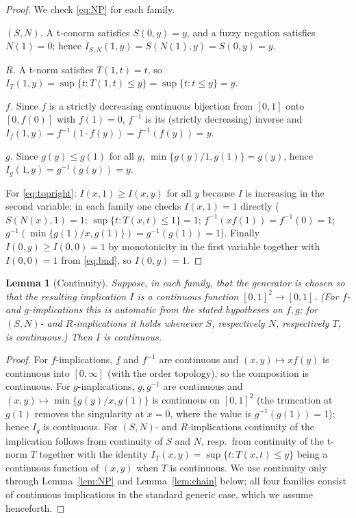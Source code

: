 \documentclass{amsart}
\theoremstyle{plain}
\newtheorem{lemma}{Lemma}
\theoremstyle{definition}
\begin{document}
\begin{proof}
We check \eqref{eq:NP} for each family.

\emph{$(S,N)$.} A t-conorm satisfies $S(0,y)=y$, and a fuzzy negation satisfies $N(1)=0$;
hence $I_{S,N}(1,y)=S(N(1),y)=S(0,y)=y$.

\emph{$R$.} A t-norm satisfies $T(1,t)=t$, so
$I_T(1,y)=\sup\{t:T(1,t)\le y\}=\sup\{t:t\le y\}=y$.

\emph{$f$.} Since $f$ is a strictly decreasing continuous bijection from $[0,1]$ onto
$[0,f(0)]$ with $f(1)=0$, $f^{-1}$ is its (strictly decreasing) inverse and
$I_f(1,y)=f^{-1}(1\cdot f(y))=f^{-1}(f(y))=y$.

\emph{$g$.} Since $g(y)\le g(1)$ for all $y$, $\min\{g(y)/1,g(1)\}=g(y)$, hence
$I_g(1,y)=g^{-1}(g(y))=y$.

For \eqref{eq:topright}: $I(x,1)\ge I(x,y)$ for all $y$ because $I$ is increasing in the
second variable; in each family one checks $I(x,1)=1$ directly
($S(N(x),1)=1$; $\sup\{t:T(x,t)\le 1\}=1$; $f^{-1}(x f(1))=f^{-1}(0)=1$;
$g^{-1}(\min\{g(1)/x,g(1)\})=g^{-1}(g(1))=1$). Finally $I(0,y)\ge I(0,0)=1$ by
monotonicity in the first variable together with $I(0,0)=1$ from \eqref{eq:bnd}, so
$I(0,y)=1$.
\end{proof}

\begin{lemma}[Continuity]\label{lem:cont}
Suppose, in each family, that the generator is chosen so that the resulting implication
$I$ is a continuous function $[0,1]^2\to[0,1]$. (For $f$- and $g$-implications this is
automatic from the stated hypotheses on $f,g$; for $(S,N)$- and $R$-implications it holds
whenever $S$, respectively $N$, respectively $T$, is continuous.) Then $I$ is continuous.
\end{lemma}

\begin{proof}
For $f$-implications, $f$ and $f^{-1}$ are continuous and $(x,y)\mapsto x f(y)$ is
continuous into $[0,\infty]$ (with the order topology), so the composition is continuous.
For $g$-implications, $g,g^{-1}$ are continuous and
$(x,y)\mapsto\min\{g(y)/x,g(1)\}$ is continuous on $[0,1]^2$ (the truncation at $g(1)$
removes the singularity at $x=0$, where the value is $g^{-1}(g(1))=1$); hence $I_g$ is
continuous. For $(S,N)$- and $R$-implications continuity of the implication follows from
continuity of $S$ and $N$, resp.\ from continuity of the t-norm $T$ together with the
identity $I_T(x,y)=\sup\{t:T(x,t)\le y\}$ being a continuous function of $(x,y)$ when $T$ is
continuous. We use continuity only through Lemma~\ref{lem:NP} and Lemma~\ref{lem:chain}
below; all four families consist of continuous implications in the standard generic case,
which we assume henceforth.
\end{proof}
\end{document}
